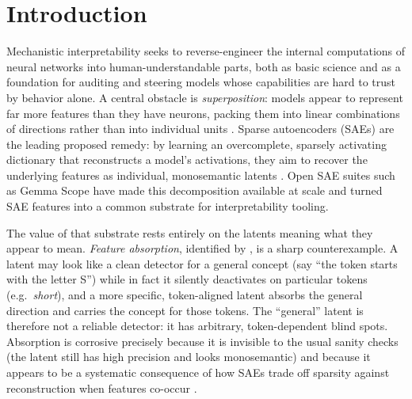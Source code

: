 \documentclass[11pt]{article}
\theoremstyle{definition}
\begin{document}
\begin{abstract}
a distributed structural feature that has almost no single-latent causal correlate. As a secondary, controlled result, we show, through
two independent task-accuracy manipulations, that ablation-based absorption is itself sensitive to
task performance, whereas the projection metric is not. We reproduce first-letter absorption and its
dependence on SAE sparsity as pipeline validation. Effects are near-floor and the study spans one
well-powered structural property, one model family, and one SAE recipe; we therefore present the result
as a metric-validity caveat, argue that representational absorption signals require causal validation,
and specify exactly what would be needed to elevate it to a robust claim. An appendix documents three
hypotheses we built controls to test and then rejected.
\end{abstract}

\tableofcontents

\section{Introduction}\label{sec:intro}
Mechanistic interpretability seeks to reverse-engineer the internal computations of neural networks into
human-understandable parts, both as basic science and as a foundation for auditing and steering models
whose capabilities are hard to trust by behavior alone. A central obstacle is \emph{superposition}: models
appear to represent far more features than they have neurons, packing them into linear combinations of
directions rather than into individual units \citep{elhage2022superposition}. Sparse autoencoders (SAEs)
are the leading proposed remedy: by learning an overcomplete, sparsely activating dictionary that
reconstructs a model's activations, they aim to recover the underlying features as individual, monosemantic
latents \citep{bricken2023monosemanticity,cunningham2023sparse,templeton2024scaling}. Open SAE suites such
as Gemma Scope \citep{lieberum2024gemmascope} have made this decomposition available at scale and turned SAE
features into a common substrate for interpretability tooling.

The value of that substrate rests entirely on the latents meaning what they appear to mean. \emph{Feature
absorption}, identified by \citet{chanin2024absorption}, is a sharp counterexample. A latent may look like a
clean detector for a general concept (say ``the token starts with the letter S'') while in fact it
silently deactivates on particular tokens (e.g.\ \emph{short}), and a more specific, token-aligned latent
absorbs the general direction and carries the concept for those tokens. The ``general'' latent is therefore
not a reliable detector: it has arbitrary, token-dependent blind spots. Absorption is corrosive precisely
because it is invisible to the usual sanity checks (the latent still has high precision and looks
monosemantic) and because it appears to be a systematic consequence of how SAEs trade off sparsity against
reconstruction when features co-occur \citep{chanin2024absorption,chanin2025hedging}.
\end{document}
